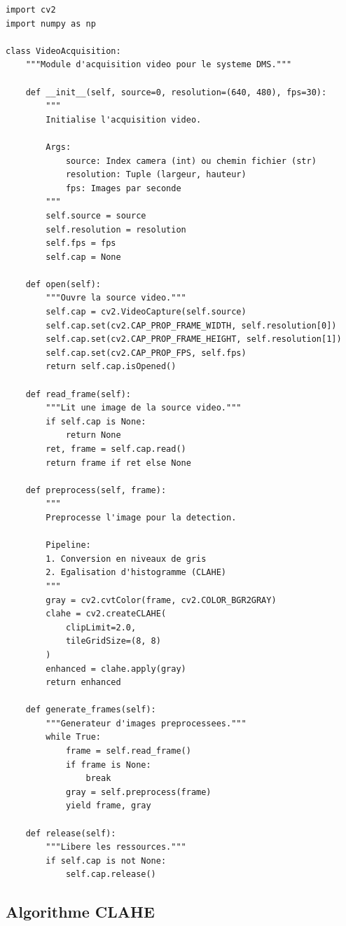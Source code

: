 \begin{lstlisting}[style=pythonstyle, caption={Module d'acquisition vidéo.}, label={lst:video_acquisition}]
import cv2
import numpy as np

class VideoAcquisition:
    """Module d'acquisition video pour le systeme DMS."""
    
    def __init__(self, source=0, resolution=(640, 480), fps=30):
        """
        Initialise l'acquisition video.
        
        Args:
            source: Index camera (int) ou chemin fichier (str)
            resolution: Tuple (largeur, hauteur)
            fps: Images par seconde
        """
        self.source = source
        self.resolution = resolution
        self.fps = fps
        self.cap = None
    
    def open(self):
        """Ouvre la source video."""
        self.cap = cv2.VideoCapture(self.source)
        self.cap.set(cv2.CAP_PROP_FRAME_WIDTH, self.resolution[0])
        self.cap.set(cv2.CAP_PROP_FRAME_HEIGHT, self.resolution[1])
        self.cap.set(cv2.CAP_PROP_FPS, self.fps)
        return self.cap.isOpened()
    
    def read_frame(self):
        """Lit une image de la source video."""
        if self.cap is None:
            return None
        ret, frame = self.cap.read()
        return frame if ret else None
    
    def preprocess(self, frame):
        """
        Preprocesse l'image pour la detection.
        
        Pipeline:
        1. Conversion en niveaux de gris
        2. Egalisation d'histogramme (CLAHE)
        """
        gray = cv2.cvtColor(frame, cv2.COLOR_BGR2GRAY)
        clahe = cv2.createCLAHE(
            clipLimit=2.0, 
            tileGridSize=(8, 8)
        )
        enhanced = clahe.apply(gray)
        return enhanced
    
    def generate_frames(self):
        """Generateur d'images preprocessees."""
        while True:
            frame = self.read_frame()
            if frame is None:
                break
            gray = self.preprocess(frame)
            yield frame, gray
    
    def release(self):
        """Libere les ressources."""
        if self.cap is not None:
            self.cap.release()
\end{lstlisting}

\subsection{Algorithme CLAHE}

